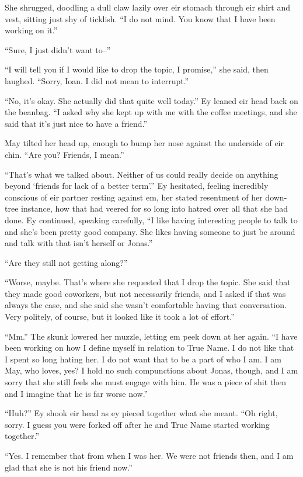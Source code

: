 She shrugged, doodling a dull claw lazily over eir stomach through eir shirt and vest, sitting just shy of ticklish. ``I do not mind. You know that I have been working on it.''

``Sure, I just didn't want to--''

``I will tell you if I would like to drop the topic, I promise,'' she said, then laughed. ``Sorry, Ioan. I did not mean to interrupt.''

``No, it's okay. She actually did that quite well today.'' Ey leaned eir head back on the beanbag. ``I asked why she kept up with me with the coffee meetings, and she said that it's just nice to have a friend.''

May tilted her head up, enough to bump her nose against the underside of eir chin. ``Are you? Friends, I mean.''

``That's what we talked about. Neither of us could really decide on anything beyond `friends for lack of a better term'.'' Ey hesitated, feeling incredibly conscious of eir partner resting against em, her stated resentment of her down-tree instance, how that had veered for so long into hatred over all that she had done. Ey continued, speaking carefully, ``I like having interesting people to talk to and she's been pretty good company. She likes having someone to just be around and talk with that isn't herself or Jonas.''

``Are they still not getting along?''

``Worse, maybe. That's where she requested that I drop the topic. She said that they made good coworkers, but not necessarily friends, and I asked if that was always the case, and she said she wasn't comfortable having that conversation. Very politely, of course, but it looked like it took a lot of effort.''

``Mm.'' The skunk lowered her muzzle, letting em peek down at her again. ``I have been working on how I define myself in relation to True Name. I do not like that I spent so long hating her. I do not want that to be a part of who I am. I am May, who loves, yes? I hold no such compunctions about Jonas, though, and I am sorry that she still feels she must engage with him. He was a piece of shit then and I imagine that he is far worse now.''

``Huh?'' Ey shook eir head as ey pieced together what she meant. ``Oh right, sorry. I guess you were forked off after he and True Name started working together.''

``Yes. I remember that from when I was her. We were not friends then, and I am glad that she is not his friend now.''

